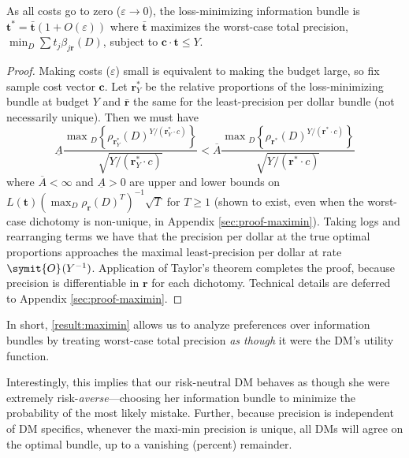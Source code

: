 \documentclass{fancyArticle}
\renewcommand{\|}{\,|\,}                    %
\providecommand{\;}{\,;}                    %
\renewcommand{\O}{\symit{O}\:\!}            %
\begin{document}
\begin{proposition}\label{result:maximin}
  As all costs go to zero ($\varepsilon \rightarrow 0$), the loss-minimizing information bundle is $\mathbf{t}^{*} = \bar{\mathbf{t}}(1+O(\varepsilon))$
  where $\bar{\mathbf{t}}$ maximizes the worst-case total precision, $\min_D\sum t_j\beta_{j \mathbf{r}}(D)$, subject to $\mathbf{c} \cdot \mathbf{t}\leq Y$.
\end{proposition}
\begin{proof}
  Making costs ($\varepsilon$) small is equivalent to making the budget large, so fix sample cost vector $\mathbf{c}$.
  Let $\mathbf{r}^{*}_{Y}$ be the relative proportions of the loss-minimizing bundle at budget $Y$ and $\bar{\mathbf{r}}$ the same for the least-precision per dollar bundle (not necessarily unique).
  Then we must have
  \begin{equation*}
    \underline{A}
    \frac{\max\textstyle_{D}
      \left\{\rho_{\symbf{r}^{*}_Y}{(D)}^{Y/(\mathbf{r}^{*}_Y\cdot c)}\right\}}
    {\sqrt{Y/(\mathbf{r}^{*}_Y\cdot c)}}
    <
    \overline{A}
    \frac{\max\textstyle_{D}
      \left\{\rho_{\mathbf{r}^{*}}{(D)}^{Y/(\mathbf{r}^{*}\cdot c)}\right\}}
    {\sqrt{Y/(\mathbf{r}^{*}\cdot c)}}
  \end{equation*}
  where $\overline{A}<\infty$ and $\underline{A}>0$ are upper and lower bounds on $L(\mathbf{t})(\max_{D} \rho_{\mathbf{r}}(D)^T)^{-1} \sqrt{T}$ for $T\geq 1$ (shown to exist, even when the worst-case dichotomy is non-unique, in Appendix \ref{sec:proof-maximin}).
  Taking logs and rearranging terms we have that the precision per dollar at the true optimal proportions approaches the maximal least-precision per dollar at rate $\O(Y^{-1})$.
  Application of Taylor's theorem completes the proof, because precision is differentiable in $\mathbf{r}$ for each dichotomy.
  Technical details are deferred to Appendix \ref{sec:proof-maximin}.
  \renewcommand{\qedsymbol}{}
\end{proof}

In short, \autoref{result:maximin} allows us to analyze preferences over information bundles by treating worst-case total precision \textit{as though} it were the DM's utility function.

Interestingly, this implies that our risk-neutral DM behaves as though she were extremely risk-\textit{averse}---choosing her information bundle to minimize the probability of the most likely mistake.
Further, because precision is independent of DM specifics, whenever the maxi-min precision is unique, all DMs will agree on the optimal bundle, up to a vanishing (percent) remainder.
\end{document}
